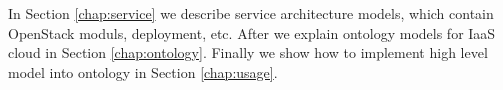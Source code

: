 In Section \ref{chap:service} we describe service architecture models, which contain OpenStack moduls, deployment, etc. After we explain ontology models for IaaS cloud in Section \ref{chap:ontology}. Finally we show how to implement high level model into ontology in Section \ref{chap:usage}. 








